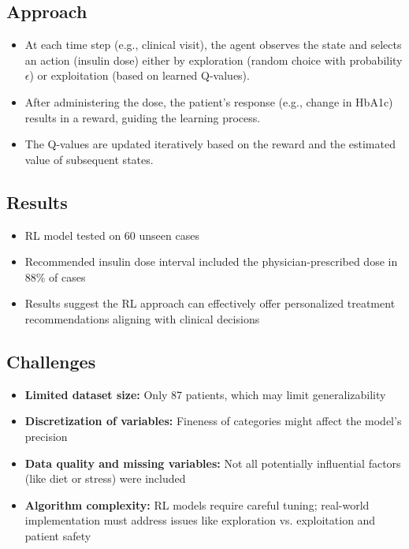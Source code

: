 \subsection*{Approach}
\begin{itemize}
    \item At each time step (e.g., clinical visit), the agent observes the state and selects an action (insulin dose) either by exploration (random choice with probability $\epsilon$) or exploitation (based on learned Q-values).
    \item After administering the dose, the patient's response (e.g., change in HbA1c) results in a reward, guiding the learning process.
    \item The Q-values are updated iteratively based on the reward and the estimated value of subsequent states.
\end{itemize}

\subsection*{Results}
\begin{itemize}
    \item RL model tested on 60 unseen cases
    \item Recommended insulin dose interval included the physician-prescribed dose in 88\% of cases
    \item Results suggest the RL approach can effectively offer personalized treatment recommendations aligning with clinical decisions
\end{itemize}

\subsection*{Challenges}
\begin{itemize}
    \item \textbf{Limited dataset size:} Only 87 patients, which may limit generalizability
    \item \textbf{Discretization of variables:} Fineness of categories might affect the model's precision
    \item \textbf{Data quality and missing variables:} Not all potentially influential factors (like diet or stress) were included
    \item \textbf{Algorithm complexity:} RL models require careful tuning; real-world implementation must address issues like exploration vs. exploitation and patient safety
\end{itemize}

